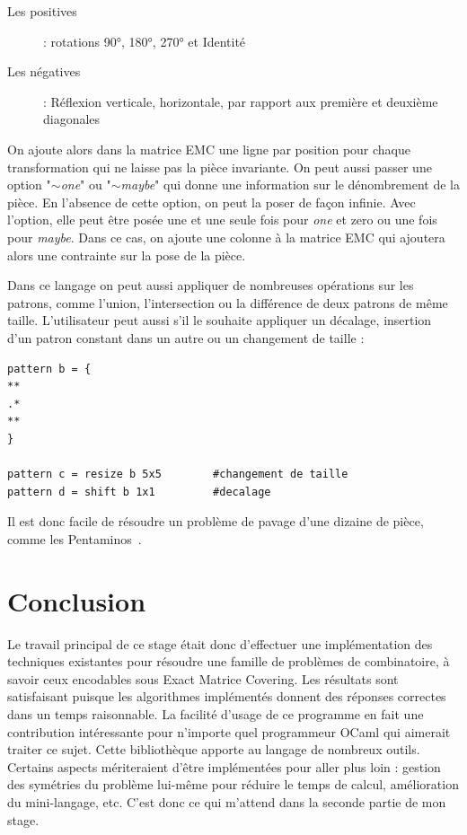 \documentclass[a4paper]{article}
\begin{document}
\begin{description}
\item[Les positives] : rotations 90°, 180°, 270° et Identité
\item[Les négatives] : Réflexion verticale, horizontale, par rapport aux 
première et deuxième diagonales
\end{description}
On ajoute alors dans la matrice EMC une ligne par position pour chaque 
transformation qui ne laisse pas la pièce invariante.
On peut aussi passer une option "\emph{$\sim$one}" ou "\emph{$\sim$maybe}" 
qui donne une information sur le dénombrement de
la pièce. En l'absence de cette option, on peut la poser de façon infinie.
Avec l'option, elle peut être posée une et une seule fois pour \emph{one}
et zero ou une fois pour \emph{maybe}.
Dans ce cas, on ajoute
une colonne à la matrice EMC qui ajoutera alors une contrainte sur la pose de 
la pièce.

Dans ce langage on peut aussi appliquer de nombreuses opérations sur les 
patrons, comme l'union, l'intersection ou la différence de deux patrons de même 
taille. L'utilisateur peut aussi s'il le souhaite appliquer un décalage,
insertion d'un patron constant dans un autre ou un changement de taille : 

\begin{lstlisting}
pattern b = {
**
.*
**
}

pattern c = resize b 5x5 		#changement de taille
pattern d = shift b 1x1			#decalage
\end{lstlisting}

Il est donc facile de résoudre un problème de pavage d'une dizaine de pièce,
comme les Pentaminos~\cite{pentamino}.

\newpage
\section{Conclusion}

Le travail principal de ce stage était donc d'effectuer une implémentation des
techniques existantes pour résoudre une famille de problèmes de combinatoire, à
savoir ceux encodables sous Exact Matrice Covering. Les résultats sont 
satisfaisant puisque les algorithmes implémentés donnent des réponses 
correctes dans un temps raisonnable. 
La facilité d'usage de ce programme en fait une 
contribution intéressante pour n'importe quel programmeur OCaml qui aimerait
traiter ce sujet. Cette bibliothèque apporte au langage de 
nombreux outils. Certains aspects mériteraient d'être implémentées pour 
aller plus loin : gestion 
des symétries du problème lui-même pour réduire le temps de calcul, amélioration
du mini-langage, etc. 
C'est donc ce qui m'attend dans la seconde partie de mon stage.
\end{document}

